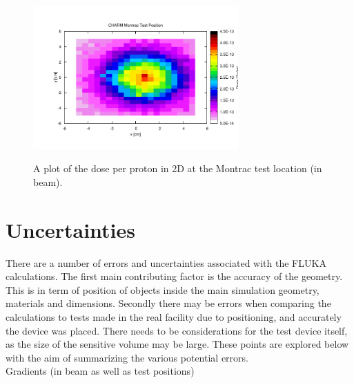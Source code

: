 \documentclass[main.tex]{subfiles}
\begin{document}
\begin{figure}[!ht]
	\centering
	\includegraphics[width=0.7\textwidth]{./images/montrac_dose_2D}\
	\caption{A plot of the dose per proton in 2D at the Montrac test location (in beam).}
	\label{fig:montrac_cp_OOOO_dose_2D}
\end{figure}

\newpage
\section{Uncertainties}

There are a number of errors and uncertainties associated with the FLUKA calculations. The first main contributing factor is the accuracy of the geometry. This is in term of position of objects inside the main simulation geometry, materials and dimensions. Secondly there may be errors when comparing the calculations to tests made in the real facility due to positioning, and accurately the device was placed. There needs to be considerations for the test device itself, as the size of the sensitive volume may be large. These points are explored below with the aim of summarizing the various potential errors. \\

Gradients (in beam as well as test positions) \\
\end{document}
